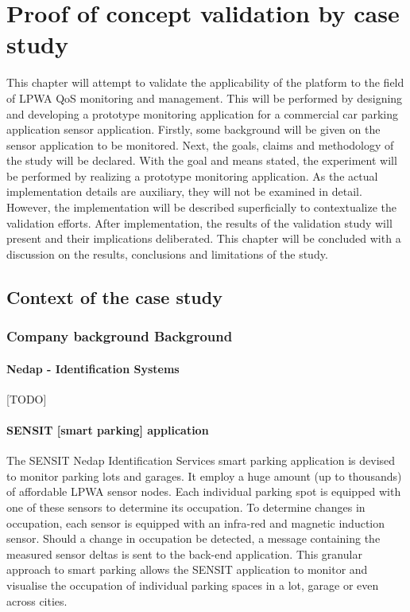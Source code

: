 \newcommand{\idsystems}{\nedap Identification Services }
\newcommand{\nedap}{Nedap }
\newcommand{\ublox}{u-blox }
\newcommand{\sensit}{SENSIT }
\chapter{Proof of concept validation by case study}
\label{ch:validation}
This chapter will attempt to validate the applicability of the platform to the field of LPWA QoS monitoring and management. This will be performed by designing and developing a prototype monitoring application for a commercial car parking application sensor application. Firstly, some background will be given on the sensor application to be monitored. Next, the goals, claims and methodology of the study will be declared. With the goal and means stated, the experiment will be performed by realizing a prototype monitoring application. As the actual implementation details are auxiliary, they will not be examined in detail. However, the implementation will be described superficially to contextualize the validation efforts. After implementation, the results of the validation study will present and their implications deliberated. This chapter will be concluded with a discussion on the results, conclusions and limitations of the study.
\section{Context of the case study}
\subsection{Company background Background}
\label{sec:sensit}
\subsubsection*{Nedap - Identification Systems}
[TODO]
\subsubsection*{\sensit [smart parking] application}
The \sensit \idsystems smart parking application is devised to monitor parking lots and garages. It employ a huge amount (up to thousands) of affordable LPWA sensor nodes. Each individual parking spot is equipped with one of these sensors to determine its occupation. To determine changes in occupation, each sensor is equipped with an infra-red and magnetic induction sensor. Should a change in occupation be detected, a message containing the measured sensor deltas is sent to the back-end application. This granular approach to smart parking allows the \sensit application to monitor and visualise the occupation of individual parking spaces in a lot, garage or even across cities.

